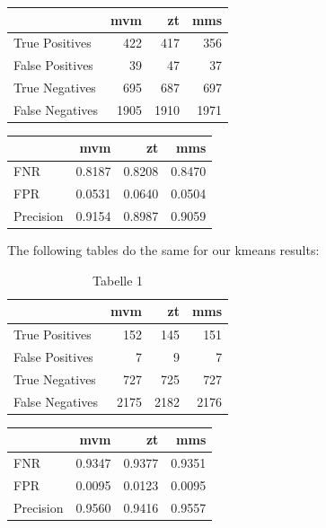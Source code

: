 \documentclass[
  12pt,
]{article}
\begin{document}
\begin{table}
\centering
\begin{tabular}{l|r|r|r}
\hline
  & mvm & zt & mms\\
\hline
True Positives & 422 & 417 & 356\\
\hline
False Positives & 39 & 47 & 37\\
\hline
True Negatives & 695 & 687 & 697\\
\hline
False Negatives & 1905 & 1910 & 1971\\
\hline
\end{tabular}
\end{table}

\begin{table}
\centering
\begin{tabular}{l|r|r|r}
\hline
  & mvm & zt & mms\\
\hline
FNR & 0.8187 & 0.8208 & 0.8470\\
\hline
FPR & 0.0531 & 0.0640 & 0.0504\\
\hline
Precision & 0.9154 & 0.8987 & 0.9059\\
\hline
\end{tabular}
\end{table}

The following tables do the same for our kmeans results:

\begin{table}

\caption{\label{tab:unnamed-chunk-7}Tabelle 1}
\centering
\begin{tabular}[t]{l|r|r|r}
\hline
  & mvm & zt & mms\\
\hline
True Positives & 152 & 145 & 151\\
\hline
False Positives & 7 & 9 & 7\\
\hline
True Negatives & 727 & 725 & 727\\
\hline
False Negatives & 2175 & 2182 & 2176\\
\hline
\end{tabular}
\end{table}

\begin{table}
\centering
\begin{tabular}{l|r|r|r}
\hline
  & mvm & zt & mms\\
\hline
FNR & 0.9347 & 0.9377 & 0.9351\\
\hline
FPR & 0.0095 & 0.0123 & 0.0095\\
\hline
Precision & 0.9560 & 0.9416 & 0.9557\\
\hline
\end{tabular}
\end{table}
\end{document}
